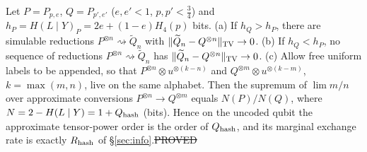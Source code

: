 \begin{theorem}\label{thm:approx-tensor}
Let $P=P_{p,e}$, $Q=P_{p',e'}$ ($e,e'<1$, $p,p'<\tfrac34$) and $h_P=H(L\mid Y)_P=2e+(1-e)H_4(p)$ bits.
(a) If $h_Q>h_P$, there are simulable reductions $P^{\otimes n}\rightsquigarrow\widetilde Q_n$ with $\|\widetilde Q_n-Q^{\otimes n}\|_{\rm TV}\to0$.
(b) If $h_Q<h_P$, no sequence of reductions $P^{\otimes n}\rightsquigarrow\widetilde Q_n$ has $\|\widetilde Q_n-Q^{\otimes n}\|_{\rm TV}\to0$.
(c) Allow free uniform labels to be appended, so that $P^{\otimes n}\otimes u^{\otimes(k-n)}$ and $Q^{\otimes m}\otimes u^{\otimes(k-m)}$, $k=\max(m,n)$, live on the same alphabet. Then the supremum of $\lim m/n$ over approximate conversions $P^{\otimes n}\to Q^{\otimes m}$ equals $N(P)/N(Q)$, where $N=2-H(L\mid Y)=1+Q_{\rm hash}$ (bits).
Hence on the uncoded qubit the approximate tensor-power order is the order of $Q_{\rm hash}$, and its marginal exchange rate is exactly $R_{\rm hash}$ of \S\ref{sec:info}.\hfill\st{PROVED}
\end{theorem}

